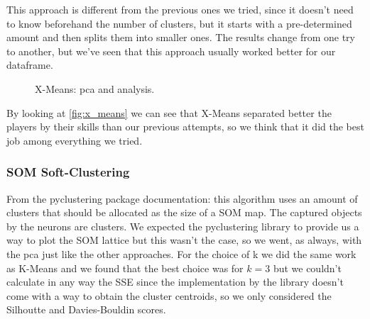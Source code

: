This approach is different from the previous ones we tried, since it doesn't need to know beforehand the number of clusters, but it starts with a pre-determined amount and then splits them into smaller ones. The results change from one try to another, but we've seen that this approach usually worked better for our dataframe.
\begin{figure}[H]
    \centering
    \caption{X-Means: pca and analysis.}
    \label{fig:x_means}
\end{figure}

By looking at \autoref{fig:x_means} we can see that X-Means separated better the players by their skills than our previous attempts, so we think that it did the best job among everything we tried.

\subsubsection{SOM Soft-Clustering}
From the pyclustering package documentation: this algorithm uses an amount of clusters that should be allocated as the size of a SOM map. The captured objects by the neurons are clusters. We expected the pyclustering library to provide us a way to plot the SOM lattice but this wasn't the case, so we went, as always, with the pca just like the other approaches. For the choice of k we did the same work as K-Means and we found that the best choice was for $k=3$ but we couldn't calculate in any way the SSE since the implementation by the library doesn't come with a way to obtain the cluster centroids, so we only considered the Silhoutte and Davies-Bouldin scores.

